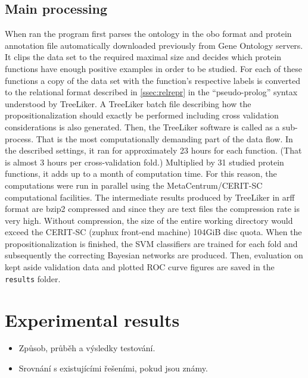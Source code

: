 \documentclass[11pt,twoside,a4paper]{book}
\begin{document}
\section{Main processing} When ran the program first parses the ontology in the obo format and protein annotation file
automatically downloaded previously from Gene Ontology servers.
It clips the data set to the required maximal size and decides which
protein functions have enough positive examples in order to be studied.
For each of these functions a copy of the data set 
with the function's respective labels is
converted to the 
relational format described in \ref{ssec:relrepr} in the ``pseudo-prolog''
syntax understood by TreeLiker.
A TreeLiker batch file describing how the propositionalization
should exactly be performed including cross validation considerations
is also generated.
Then, the TreeLiker software is called as a sub-process.
That is the most computationally demanding part of the data flow.
In the described settings, it ran for approximately 23 hours for each function.
(That is almost 3 hours per cross-validation fold.)
Multiplied by 31 studied protein functions, it adds up to a month of computation time.
For this reason, the computations were run in parallel 
using the MetaCentrum/CERIT-SC computational facilities.
The intermediate results produced by TreeLiker in arff format are bzip2 compressed
and since they are text files the compression rate is very high. 
Without compression, the size of the entire working directory
would exceed the CERIT-SC (zuphux front-end machine) 104GiB disc quota.
When the propositionalization is finished,
the SVM classifiers are trained for each fold
and subsequently the correcting Bayesian networks are produced.
Then, evaluation on kept aside validation data 
and plotted ROC curve figures are saved
in the \texttt{results} folder.


\chapter{Experimental results}
\label{ch:results}

\begin{itemize}
 \item Způsob, průběh a výsledky testování.
 \item Srovnání s existujícími řešeními, pokud jsou známy.
\end{itemize} 


\end{document}
